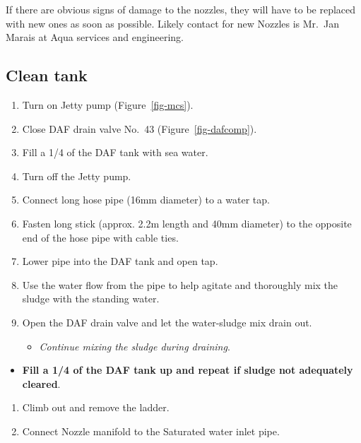 \documentclass[
  letterpaper,
  DIV=11,
  numbers=noendperiod]{scrreprt}
\providecommand{\tightlist}{%
  \setlength{\itemsep}{0pt}\setlength{\parskip}{0pt}}\usepackage{longtable,booktabs,array}
\begin{document}
{If there are obvious signs of damage to the nozzles, they will have to
be replaced with new ones as soon as possible}. {Likely contact for new
Nozzles is Mr.~Jan Marais at Aqua services and engineering}.

\hypertarget{sec-clean-daf-tank}{%
\subsection{Clean tank}\label{sec-clean-daf-tank}}

\begin{enumerate}
\def\labelenumi{\arabic{enumi}.}
\setcounter{enumi}{23}
\tightlist
\item
  Turn on Jetty pump (Figure~\ref{fig-mcs}).
\item
  Close DAF drain valve No.~43 (Figure~\ref{fig-dafcomp}).
\item
  Fill a 1/4 of the DAF tank with sea water.
\item
  Turn off the Jetty pump.
\item
  Connect long hose pipe (16mm diameter) to a water tap.
\item
  Fasten long stick (approx. 2.2m length and 40mm diameter) to the
  opposite end of the hose pipe with cable ties.
\item
  Lower pipe into the DAF tank and open tap.
\item
  Use the water flow from the pipe to help agitate and thoroughly mix
  the sludge with the standing water.
\item
  Open the DAF drain valve and let the water-sludge mix drain out.

  \begin{itemize}
  \tightlist
  \item
    \emph{Continue mixing the sludge during draining}.
  \end{itemize}
\end{enumerate}

\begin{itemize}
\tightlist
\item
  \textbf{Fill a 1/4 of the DAF tank up and repeat if sludge not
  adequately cleared}.
\end{itemize}

\begin{enumerate}
\def\labelenumi{\arabic{enumi}.}
\setcounter{enumi}{32}
\tightlist
\item
  Climb out and remove the ladder.
\item
  Connect Nozzle manifold to the Saturated water inlet pipe.
\end{enumerate}
\end{document}
